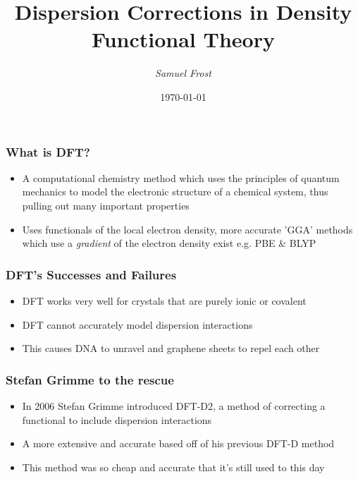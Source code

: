 \documentclass[12pt]{beamer}
\title{Dispersion Corrections in Density Functional Theory}    %
\author{\itshape Samuel  Frost}                 %
\institute{University of Nottingham}      %
\date{\today}                    %
\begin{document}
\begin{frame}
  \titlepage
\end{frame}
                           
\begin{frame}
  \frametitle{What is DFT?}
  \begin{itemize}
    \item A computational chemistry method which uses the principles of quantum mechanics to model the electronic structure of a chemical system, thus pulling out many important properties
    \item Uses functionals of the local electron density, more accurate 'GGA' methods which use a 
    \emph{gradient} of the electron density exist e.g. PBE \& BLYP 
  \end{itemize}
\end{frame}

\begin{frame}
  \frametitle{DFT's Successes and Failures}
  \begin{itemize}
    \item<1-> DFT works very well for crystals that are purely ionic or covalent
    \item<2-> DFT cannot accurately model dispersion interactions
    \item<2-> This causes DNA to unravel and graphene sheets to repel each other
  \end{itemize}
\end{frame}

\begin{frame}
  \frametitle{Stefan Grimme to the rescue}
  \begin{itemize}
    \item In 2006 Stefan Grimme introduced DFT-D2, a method of correcting a functional to include dispersion interactions\footnotemark
    \item A more extensive and accurate based off of his previous DFT-D method
    \item This method was so cheap and accurate that it's still used to this day 
  \end{itemize}
\end{frame}
\end{document}
